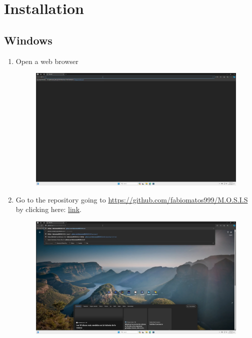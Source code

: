 \documentclass[12pt]{article}
\begin{document}

\tableofcontents
\newpage
\section{Installation}
\subsection{Windows}
\newpage
\begin{center}

	\begin{enumerate}
		\item Open a web browser
		      \begin{figure}[H]
			      \includegraphics[width=\textwidth]{Figures/Windows-Open-Web-Browser.png}
		      \end{figure}
		\item Go to the repository going to \href{https://github.com/fabiomatos999/M.O.S.I.S}{https://github.com/fabiomatos999/M.O.S.I.S} by clicking here: \href{https://github.com/fabiomatos999/M.O.S.I.S}{link}.
		      \begin{figure}[H]
			      \includegraphics[width=\textwidth]{Figures/Windows-Go-To-Repo.png}

\end{figure}
\end{enumerate}
\end{center}
\end{document}
